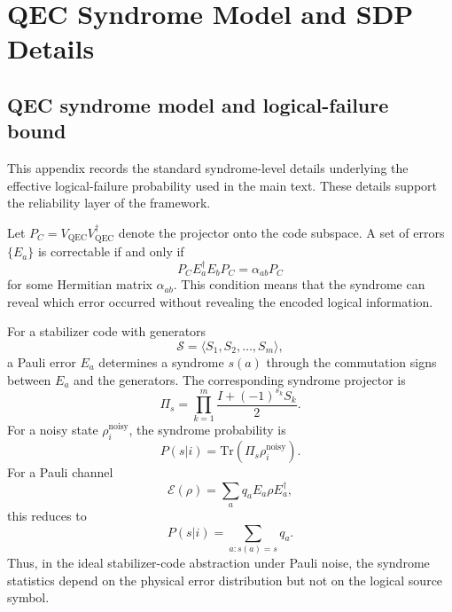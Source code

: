\documentclass[
 reprint,
 amsmath,amssymb,
 aps,
 pra,
 floatfix,
]{revtex4-2}
\begin{document}
\section{QEC Syndrome Model and SDP Details}
\label{app:qec_sdp_details}

\subsection{QEC syndrome model and logical-failure bound}
\label{app:qec_syndrome}

This appendix records the standard syndrome-level details underlying the effective logical-failure probability used in the main text. These details support the reliability layer of the framework.

Let $P_C=V_{\mathrm{QEC}}V_{\mathrm{QEC}}^\dagger$ denote the projector onto the code subspace. A set of errors $\{E_a\}$ is correctable if and only if
\begin{equation}
    P_C E_a^\dagger E_b P_C
    =
    \alpha_{ab}P_C
\end{equation}
for some Hermitian matrix $\alpha_{ab}$. This condition means that the syndrome can reveal which error occurred without revealing the encoded logical information.

For a stabilizer code with generators
\begin{equation}
    \mathcal{S}=\langle S_1,S_2,\ldots,S_m\rangle,
\end{equation}
a Pauli error $E_a$ determines a syndrome $s(a)$ through the commutation signs between $E_a$ and the generators. The corresponding syndrome projector is
\begin{equation}
    \Pi_s
    =
    \prod_{k=1}^{m}
    \frac{I+(-1)^{s_k}S_k}{2}.
\end{equation}
For a noisy state $\rho_i^{\mathrm{noisy}}$, the syndrome probability is
\begin{equation}
    P(s|i)
    =
    \mathrm{Tr}\left(\Pi_s\rho_i^{\mathrm{noisy}}\right).
\end{equation}
For a Pauli channel
\begin{equation}
    \mathcal{E}(\rho)=\sum_a q_aE_a\rho E_a^\dagger,
\end{equation}
this reduces to
\begin{equation}
    P(s|i)
    =
    \sum_{a:s(a)=s}q_a.
\end{equation}
Thus, in the ideal stabilizer-code abstraction under Pauli noise, the syndrome statistics depend on the physical error distribution but not on the logical source symbol.
\end{document}
